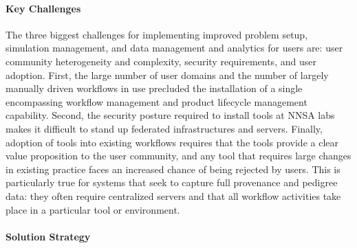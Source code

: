 \paragraph{Key Challenges}

The three biggest challenges for implementing improved problem setup,
simulation management, and data management and analytics for users are: user
community heterogeneity and complexity, security requirements, and user
adoption. First, the large number of user domains and the number of largely
manually driven workflows in use precluded the installation of a single
encompassing workflow management and product lifecycle management capability.
Second, the security posture required to install tools at NNSA labs makes it
difficult to stand up federated infrastructures and servers.  Finally, adoption
of tools into existing workflows requires that the tools provide a clear value
proposition to the user community, and any tool that requires large changes in
existing practice faces an increased chance of being rejected by users. This is
particularly true for systems that seek to capture full provenance and pedigree
data: they often require centralized servers and that all workflow activities
take place in a particular tool or environment.

\paragraph{Solution Strategy}


